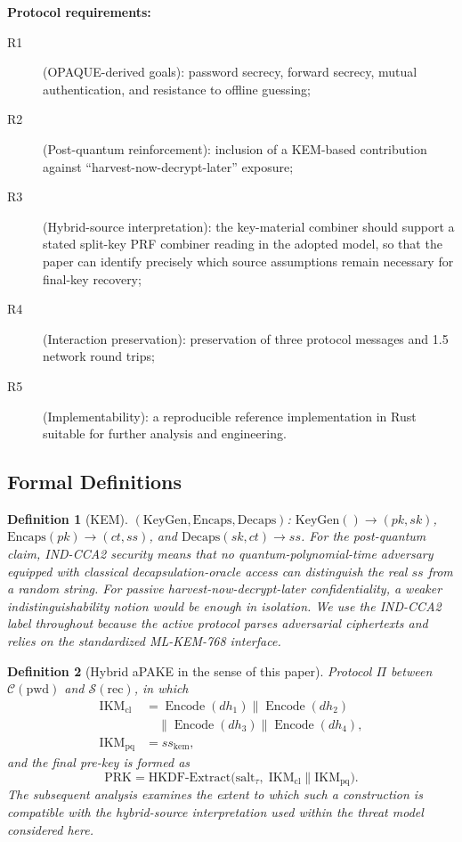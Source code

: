 \documentclass[preprint,12pt]{elsarticle}
\newtheorem{definition}{Definition}[section]
\theoremstyle{remark}
\begin{document}
\textbf{Protocol requirements:}
\begin{description}
  \item[R1] (OPAQUE-derived goals): password secrecy, forward secrecy,
        mutual authentication, and resistance to offline guessing;
  \item[R2] (Post-quantum reinforcement): inclusion of a KEM-based
        contribution against ``harvest-now-decrypt-later'' exposure;
  \item[R3] (Hybrid-source interpretation): the key-material combiner
        should support a stated split-key PRF combiner reading in the adopted
        model, so that the paper can identify precisely which source
        assumptions remain necessary for final-key recovery;
  \item[R4] (Interaction preservation): preservation of three protocol
        messages and 1.5 network round trips;
  \item[R5] (Implementability): a reproducible reference implementation
        in Rust suitable for further analysis and engineering.
\end{description}

\subsection{Formal Definitions}

\begin{definition}[KEM]
$(\mathrm{KeyGen}, \mathrm{Encaps}, \mathrm{Decaps})$:
$\mathrm{KeyGen}() \to (pk, sk)$,
$\mathrm{Encaps}(pk) \to (ct, ss)$, and
$\mathrm{Decaps}(sk, ct) \to ss$.
For the post-quantum claim, IND-CCA2 security means that no
quantum-polynomial-time adversary equipped with classical decapsulation-oracle
access can distinguish the real $ss$ from a random string.
For passive harvest-now-decrypt-later confidentiality, a weaker
indistinguishability notion would be enough in isolation. We use the
IND-CCA2 label throughout because the active protocol parses adversarial
ciphertexts and relies on the standardized ML-KEM-768 interface.
\end{definition}

\begin{definition}[Hybrid aPAKE in the sense of this paper]
Protocol $\Pi$ between $\mathcal{C}(\mathrm{pwd})$ and
$\mathcal{S}(\mathrm{rec})$, in which
\[
  \begin{aligned}
    \mathrm{IKM}_{\mathrm{cl}}
      &= \operatorname{Encode}(dh_1) \| \operatorname{Encode}(dh_2)\\
      &\quad \| \operatorname{Encode}(dh_3) \|
        \operatorname{Encode}(dh_4),\\
    \mathrm{IKM}_{\mathrm{pq}} &= ss_{\mathrm{kem}},
  \end{aligned}
\]
and the final pre-key is formed as
\[
  \mathrm{PRK} = \mathrm{HKDF\text{-}Extract}\!\bigl(
    \mathrm{salt}_{\tau},\;
    \mathrm{IKM}_{\mathrm{cl}} \| \mathrm{IKM}_{\mathrm{pq}}\bigr).
\]
The subsequent analysis examines the extent to which such a
construction is compatible with the hybrid-source interpretation used
within the threat model considered here.
\end{definition}
\end{document}
